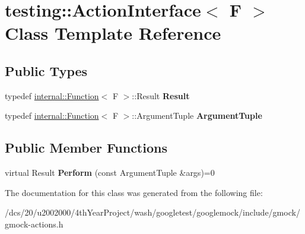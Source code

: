 \hypertarget{classtesting_1_1ActionInterface}{}\section{testing\+:\+:Action\+Interface$<$ F $>$ Class Template Reference}
\label{classtesting_1_1ActionInterface}
\subsection*{Public Types}
\begin{DoxyCompactItemize}
\item 
\mbox{\label{classtesting_1_1ActionInterface_a7477de2fe3e4e01c59db698203acaee7}} 
typedef \mbox{\hyperlink{structtesting_1_1internal_1_1Function}{internal\+::\+Function}}$<$ F $>$\+::Result {\bfseries Result}
\item 
\mbox{\label{classtesting_1_1ActionInterface_af72720d864da4d606629e83edc003511}} 
typedef \mbox{\hyperlink{structtesting_1_1internal_1_1Function}{internal\+::\+Function}}$<$ F $>$\+::Argument\+Tuple {\bfseries Argument\+Tuple}
\end{DoxyCompactItemize}
\subsection*{Public Member Functions}
\begin{DoxyCompactItemize}
\item 
\mbox{\label{classtesting_1_1ActionInterface_a20f8624fcea1786f2992b358760422a0}} 
virtual Result {\bfseries Perform} (const Argument\+Tuple \&args)=0
\end{DoxyCompactItemize}


The documentation for this class was generated from the following file\+:\begin{DoxyCompactItemize}
\item 
/dcs/20/u2002000/4th\+Year\+Project/wash/googletest/googlemock/include/gmock/gmock-\/actions.\+h\end{DoxyCompactItemize}
